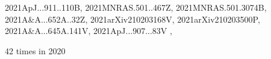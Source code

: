 \documentclass[12pt]{article}
\begin{document}
\begin{description}
{2021ApJ...911..110B,%
2021MNRAS.501..467Z,%
2021MNRAS.501.3074B,%
2021A&A...652A..32Z,%
2021arXiv210203168V,%
2021arXiv210203500P,%
2021A&A...645A.141V,%
2021ApJ...907...83V%
},\item
\item %
42 times in 2020 \citep{
2020arXiv201206343B,%
2020DPS....5210301H,%
2020PhRvD.102b3536B,%
2020ApJ...898..112P,%
2020ApJ...901...54K,%
2020MNRAS.496.4749B,%
2020JPlPh..86c9018R,%
2020A&A...638A..69W,%
2020ApJ...896...86C,%
Zhang_etal_2020comb,%
2020MNRAS.491.1043N,%
2020arXiv200111929P,%
2020ApJ...901...18B,%
2020arXiv200203638B,%
}
\end{description}
\end{document}
